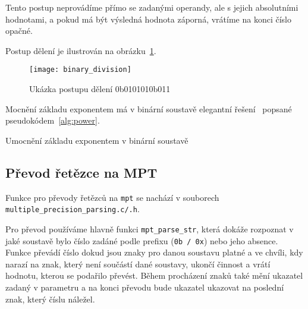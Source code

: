 Tento postup neprovádíme přímo se zadanými operandy, ale s jejich absolutními hodnotami, a pokud má být výsledná hodnota záporná, vrátíme na konci číslo opačné.

Postup dělení je ilustrován na obrázku~\ref{fig:binary_division}.

\begin{figure}[ht]
    \centering
    \texttt{[image: binary\_division]}
    \caption{Ukázka postupu dělení 0b010101\textdiv0b011}\label{fig:binary_division}
\end{figure}
\newpage

Mocnění základu exponentem má v binární soustavě elegantní řešení~\cite{bib:power} popsané pseudokódem~\ref{alg:power}.

\begin{algorithm}[H]
\caption{Umocnění základu exponentem v binární soustavě}\label{alg:power}
\begin{algorithmic}[1]
\scriptsize{
	\EndIf{}
	\EndIf{}
        \EndIf{}
    \EndFor{}
\EndFunction{}
}
\end{algorithmic}
\end{algorithm}

\subsection{Převod řetězce na MPT}
Funkce pro převody řetězců na \verb|mpt| se nachází v souborech \\ \verb|multiple_precision_parsing.c/.h|.

Pro převod používáme hlavně funkci \verb|mpt_parse_str|, která dokáže rozpoznat v jaké soustavě bylo číslo zadáné podle prefixu (\verb|0b / 0x|) nebo jeho absence. Funkce převádí číslo dokud jsou znaky pro danou soustavu platné a ve chvíli, kdy narazí na znak, který není součástí dané soustavy, ukončí činnost a vrátí hodnotu, kterou se podařilo převést. Během procházení znaků také mění ukazatel zadaný v parametru a na konci převodu bude ukazatel ukazovat na poslední znak, který číslu náležel.

